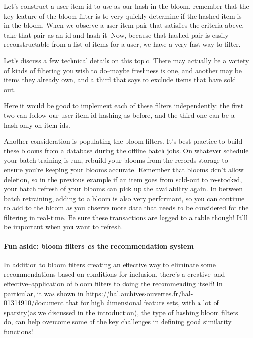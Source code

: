 Let's construct a user-item id to use as our hash in the bloom, remember that the key feature of the bloom filter is to very quickly determine if the hashed item is in the bloom. When we observe a user-item pair that satisfies the criteria above, take that pair as an id and hash it. Now, because that hashed pair is easily reconstructable from a list of items for a user, we have a very fast way to filter.

Let's discuss a few technical details on this topic. There may actually be a variety of kinds of filtering you wish to do–maybe freshness is one, and another may be items they already own, and a third that says to exclude items that have sold out.

Here it would be good to implement each of these filters independently; the first two can follow our user-item id hashing as before, and the third one can be a hash only on item ids.

Another consideration is populating the bloom filters. It's best practice to build these blooms from a database during the offline batch jobs. On whatever schedule your batch training is run, rebuild your blooms from the records storage to ensure you're keeping your blooms accurate. Remember that blooms don't allow deletion, so in the previous example if an item goes from sold-out to re-stocked, your batch refresh of your blooms can pick up the availability again. In between batch retraining, adding to a bloom is also very performant, so you can continue to add to the bloom as you observe more data that needs to be considered for the filtering in real-time. Be sure these transactions are logged to a table though! It'll be important when you want to refresh. 

\paragraph{Fun aside: bloom filters \emph{as} the recommendation system}

In addition to bloom filters creating an effective way to eliminate some recommendations based on conditions for inclusion, there's a creative–and effective–application of bloom filters to doing the recommending itself! In particular, it was shown in \url{https://hal.archives-ouvertes.fr/hal-01314910/document} that for high dimensional feature sets, with a lot of sparsity(as we discussed in the introduction), the type of hashing bloom filters do, can help overcome some of the key challenges in defining good similarity functions!

